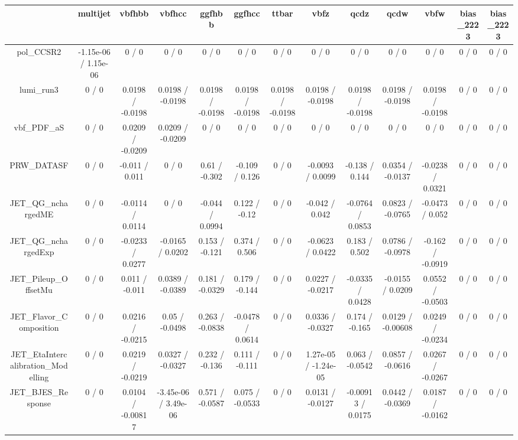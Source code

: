 \documentclass[10pt]{article}
\begin{document}
\begin{table}[htbp]
\begin{center}
\begin{tabular}{|c|c|c|c|c|c|c|c|c|c|c|c|c|}
\hline 
      & multijet      & vbfhbb      & vbfhcc      & ggfhbb      & ggfhcc      & ttbar      & vbfz      & qcdz      & qcdw      & vbfw      & bias_2223      & bias_2223 \\ 
\hline 
  pol_CCSR2 & -1.15e-06 / 1.15e-06 & 0 / 0 & 0 / 0 & 0 / 0 & 0 / 0 & 0 / 0 & 0 / 0 & 0 / 0 & 0 / 0 & 0 / 0 & 0 / 0 & 0 / 0 \\ 
  lumi_run3 & 0 / 0 & 0.0198 / -0.0198 & 0.0198 / -0.0198 & 0.0198 / -0.0198 & 0.0198 / -0.0198 & 0.0198 / -0.0198 & 0.0198 / -0.0198 & 0.0198 / -0.0198 & 0.0198 / -0.0198 & 0.0198 / -0.0198 & 0 / 0 & 0 / 0 \\ 
  vbf_PDF_aS & 0 / 0 & 0.0209 / -0.0209 & 0.0209 / -0.0209 & 0 / 0 & 0 / 0 & 0 / 0 & 0 / 0 & 0 / 0 & 0 / 0 & 0 / 0 & 0 / 0 & 0 / 0 \\ 
  PRW_DATASF & 0 / 0 & -0.011 / 0.011 & 0 / 0 & 0.61 / -0.302 & -0.109 / 0.126 & 0 / 0 & -0.0093 / 0.0099 & -0.138 / 0.144 & 0.0354 / -0.0137 & -0.0238 / 0.0321 & 0 / 0 & 0 / 0 \\ 
  JET_QG_nchargedME & 0 / 0 & -0.0114 / 0.0114 & 0 / 0 & -0.044 / 0.0994 & 0.122 / -0.12 & 0 / 0 & -0.042 / 0.042 & -0.0764 / 0.0853 & 0.0823 / -0.0765 & -0.0473 / 0.052 & 0 / 0 & 0 / 0 \\ 
  JET_QG_nchargedExp & 0 / 0 & -0.0233 / 0.0277 & -0.0165 / 0.0202 & 0.153 / -0.121 & 0.374 / 0.506 & 0 / 0 & -0.0623 / 0.0422 & 0.183 / 0.502 & 0.0786 / -0.0978 & -0.162 / -0.0919 & 0 / 0 & 0 / 0 \\ 
  JET_Pileup_OffsetMu & 0 / 0 & 0.011 / -0.011 & 0.0389 / -0.0389 & 0.181 / -0.0329 & 0.179 / -0.144 & 0 / 0 & 0.0227 / -0.0217 & -0.0335 / 0.0428 & -0.0155 / 0.0209 & 0.0552 / -0.0503 & 0 / 0 & 0 / 0 \\ 
  JET_Flavor_Composition & 0 / 0 & 0.0216 / -0.0215 & 0.05 / -0.0498 & 0.263 / -0.0838 & -0.0478 / 0.0614 & 0 / 0 & 0.0336 / -0.0327 & 0.174 / -0.165 & 0.0129 / -0.00608 & 0.0249 / -0.0234 & 0 / 0 & 0 / 0 \\ 
  JET_EtaIntercalibration_Modelling & 0 / 0 & 0.0219 / -0.0219 & 0.0327 / -0.0327 & 0.232 / -0.136 & 0.111 / -0.111 & 0 / 0 & 1.27e-05 / -1.24e-05 & 0.063 / -0.0542 & 0.0857 / -0.0616 & 0.0267 / -0.0267 & 0 / 0 & 0 / 0 \\ 
  JET_BJES_Response & 0 / 0 & 0.0104 / -0.00817 & -3.45e-06 / 3.49e-06 & 0.571 / -0.0587 & 0.075 / -0.0533 & 0 / 0 & 0.0131 / -0.0127 & -0.00913 / 0.0175 & 0.0442 / -0.0369 & 0.0187 / -0.0162 & 0 / 0 & 0 / 0 \\ 

\end{tabular}
\end{center}
\end{table}
\end{document}
